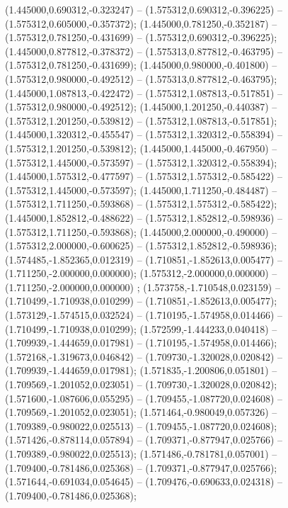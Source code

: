  (1.445000,0.690312,-0.323247) -- (1.575312,0.690312,-0.396225) -- (1.575312,0.605000,-0.357372);
 (1.445000,0.781250,-0.352187) -- (1.575312,0.781250,-0.431699) -- (1.575312,0.690312,-0.396225);
 (1.445000,0.877812,-0.378372) -- (1.575313,0.877812,-0.463795) -- (1.575312,0.781250,-0.431699);
 (1.445000,0.980000,-0.401800) -- (1.575312,0.980000,-0.492512) -- (1.575313,0.877812,-0.463795);
 (1.445000,1.087813,-0.422472) -- (1.575312,1.087813,-0.517851) -- (1.575312,0.980000,-0.492512);
 (1.445000,1.201250,-0.440387) -- (1.575312,1.201250,-0.539812) -- (1.575312,1.087813,-0.517851);
 (1.445000,1.320312,-0.455547) -- (1.575312,1.320312,-0.558394) -- (1.575312,1.201250,-0.539812);
 (1.445000,1.445000,-0.467950) -- (1.575312,1.445000,-0.573597) -- (1.575312,1.320312,-0.558394);
 (1.445000,1.575312,-0.477597) -- (1.575312,1.575312,-0.585422) -- (1.575312,1.445000,-0.573597);
 (1.445000,1.711250,-0.484487) -- (1.575312,1.711250,-0.593868) -- (1.575312,1.575312,-0.585422);
 (1.445000,1.852812,-0.488622) -- (1.575312,1.852812,-0.598936) -- (1.575312,1.711250,-0.593868);
 (1.445000,2.000000,-0.490000) -- (1.575312,2.000000,-0.600625) -- (1.575312,1.852812,-0.598936);
 (1.574485,-1.852365,0.012319) -- (1.710851,-1.852613,0.005477) -- (1.711250,-2.000000,0.000000);
 (1.575312,-2.000000,0.000000) -- (1.711250,-2.000000,0.000000) ;
 (1.573758,-1.710548,0.023159) -- (1.710499,-1.710938,0.010299) -- (1.710851,-1.852613,0.005477);
 (1.573129,-1.574515,0.032524) -- (1.710195,-1.574958,0.014466) -- (1.710499,-1.710938,0.010299);
 (1.572599,-1.444233,0.040418) -- (1.709939,-1.444659,0.017981) -- (1.710195,-1.574958,0.014466);
 (1.572168,-1.319673,0.046842) -- (1.709730,-1.320028,0.020842) -- (1.709939,-1.444659,0.017981);
 (1.571835,-1.200806,0.051801) -- (1.709569,-1.201052,0.023051) -- (1.709730,-1.320028,0.020842);
 (1.571600,-1.087606,0.055295) -- (1.709455,-1.087720,0.024608) -- (1.709569,-1.201052,0.023051);
 (1.571464,-0.980049,0.057326) -- (1.709389,-0.980022,0.025513) -- (1.709455,-1.087720,0.024608);
 (1.571426,-0.878114,0.057894) -- (1.709371,-0.877947,0.025766) -- (1.709389,-0.980022,0.025513);
 (1.571486,-0.781781,0.057001) -- (1.709400,-0.781486,0.025368) -- (1.709371,-0.877947,0.025766);
 (1.571644,-0.691034,0.054645) -- (1.709476,-0.690633,0.024318) -- (1.709400,-0.781486,0.025368);
